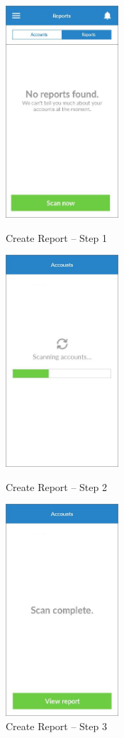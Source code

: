 \begin{figure}
  \subfigures
  \centering
  \begin{minipage}{4.6cm}
    \centering
    \includegraphics[width=4.2cm]{inc/ui_create_report_step1.jpg}
    \caption{Create Report -- Step 1}
    \label{fig:ui_create_report_step1}
  \end{minipage}
  \begin{minipage}{4.6cm}
    \centering
    \includegraphics[width=4.2cm]{inc/ui_create_report_step2.jpg}
    \caption{Create Report -- Step 2}
    \label{fig:ui_create_report_step2}
  \end{minipage}
  \begin{minipage}{4.6cm}
    \centering
    \includegraphics[width=4.2cm]{inc/ui_create_report_step3.jpg}
    \caption{Create Report -- Step 3}
    \label{fig:ui_create_report_step3}
  \end{minipage}
\end{figure}

